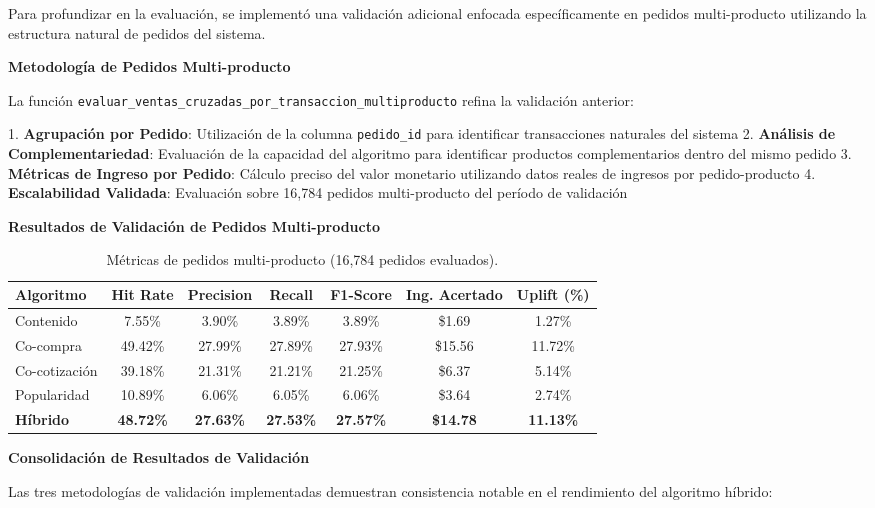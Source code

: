 \documentclass[twocolumn]{article}
\begin{document}
Para profundizar en la evaluación, se implementó una validación adicional enfocada específicamente en pedidos multi-producto utilizando la estructura natural de pedidos del sistema.

\textbf{Metodología de Pedidos Multi-producto}

La función \texttt{evaluar\_ventas\_cruzadas\_por\_transaccion\_multiproducto} refina la validación anterior:

1. \textbf{Agrupación por Pedido}: Utilización de la columna \texttt{pedido\_id} para identificar transacciones naturales del sistema
2. \textbf{Análisis de Complementariedad}: Evaluación de la capacidad del algoritmo para identificar productos complementarios dentro del mismo pedido
3. \textbf{Métricas de Ingreso por Pedido}: Cálculo preciso del valor monetario utilizando datos reales de ingresos por pedido-producto
4. \textbf{Escalabilidad Validada}: Evaluación sobre 16,784 pedidos multi-producto del período de validación

\textbf{Resultados de Validación de Pedidos Multi-producto}

\begin{table}[H]
\centering
\tiny
\begin{tabular}{|l|c|c|c|c|c|c|}
\hline
\textbf{Algoritmo} & \textbf{Hit Rate} & \textbf{Precision} & \textbf{Recall} & \textbf{F1-Score} & \textbf{Ing. Acertado} & \textbf{Uplift (\%)} \\
\hline
Contenido & 7.55\% & 3.90\% & 3.89\% & 3.89\% & \$1.69 & 1.27\% \\
\hline
Co-compra & 49.42\% & 27.99\% & 27.89\% & 27.93\% & \$15.56 & 11.72\% \\
\hline
Co-cotización & 39.18\% & 21.31\% & 21.21\% & 21.25\% & \$6.37 & 5.14\% \\
\hline
Popularidad & 10.89\% & 6.06\% & 6.05\% & 6.06\% & \$3.64 & 2.74\% \\
\hline
\textbf{Híbrido} & \textbf{48.72\%} & \textbf{27.63\%} & \textbf{27.53\%} & \textbf{27.57\%} & \textbf{\$14.78} & \textbf{11.13\%} \\
\hline
\end{tabular}
\caption{Métricas de pedidos multi-producto (16,784 pedidos evaluados).}
\end{table}

\textbf{Consolidación de Resultados de Validación}

Las tres metodologías de validación implementadas demuestran consistencia notable en el rendimiento del algoritmo híbrido:
\end{document}
